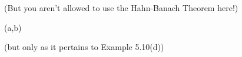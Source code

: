 \documentclass[minion]{homework}
\begin{document}
\begin{aproblems}

 (But you aren't allowed to use the Hahn-Banach Theorem here!)

 (a,b)


 (but only as it pertains to Example 5.10(d))




\end{aproblems}
\end{document}
